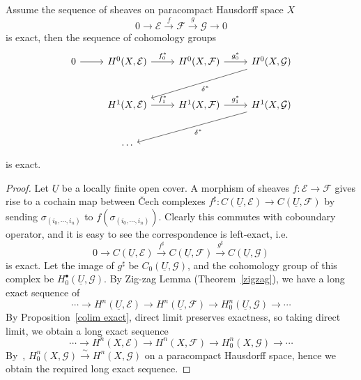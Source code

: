 \begin{thm}
    Assume the sequence of sheaves on paracompact Hausdorff space $X$
    \[0\to\mathcal{E}\xrightarrow{f}\mathcal{F}\xrightarrow{g}\mathcal{G}\to 0\]
    is exact, then the sequence of cohomology groups
    \[\begin{tikzcd}
        0 \ar[r] & H^0(X,\mathcal{E}) \ar[r, "f_0^*"] & H^0(X,\mathcal{F}) \ar[r, "g_0^*"] & H^0(X,\mathcal{G}) \ar[dll, "\delta^*"] \\[3mm]
        {} & H^1(X,\mathcal{E}) \ar[r, "f_1^*"] & H^1(X,\mathcal{F}) \ar[r, "g_1^*"] & H^1(X,\mathcal{G}) \ar[dll, "\delta^*"] \\[3mm]
        {} & \cdots & {} & {}
    \end{tikzcd}\]
    is exact.
\end{thm}
\begin{proof}
    Let $\underline{U}$ be a locally finite open cover.
    A morphism of sheaves $f:\mathcal{E}\to\mathcal{F}$ gives rise to a cochain map between \v{C}ech complexes $f^\sharp:C(\underline{U},\mathcal{E})\to C(\underline{U},\mathcal{F})$ by sending $\sigma_{(i_0,\cdots,i_n)}$ to $f(\sigma_{(i_0,\cdots,i_n)})$.
    Clearly this commutes with coboundary operator, and it is easy to see the correspondence is left-exact, i.e.\
    \[0\to C(\underline{U},\mathcal{E})\xrightarrow{f^\sharp}C(\underline{U},\mathcal{F})\xrightarrow{g^\sharp}C(\underline{U},\mathcal{G})\]
    is exact.
    Let the image of $g^\sharp$ be $C_0(\underline{U},\mathcal{G})$, and the cohomology group of this complex be $H^\bullet_0(\underline{U},\mathcal{G})$.
    By Zig-zag Lemma (Theorem~\ref{zigzag}), we have a long exact sequence of
    \[\cdots\to H^n(\underline{U},\mathcal{E})\to H^n(\underline{U},\mathcal{F})\to H^n_0(\underline{U},\mathcal{G})\to\cdots\]
    By Proposition~\ref{colim exact}, direct limit preserves exactness, so taking direct limit, we obtain a long exact sequence
    \[\cdots\to H^n(X,\mathcal{E})\to H^n(X,\mathcal{F})\to H^n_0(X,\mathcal{G})\to\cdots\]
    By~\cite[25.\ Proposition 7]{FAC}, $H^n_0(X,\mathcal{G})\xrightarrow{\sim}H^n(X,\mathcal{G})$ on a paracompact Hausdorff space, hence we obtain the required long exact sequence.
\end{proof}


